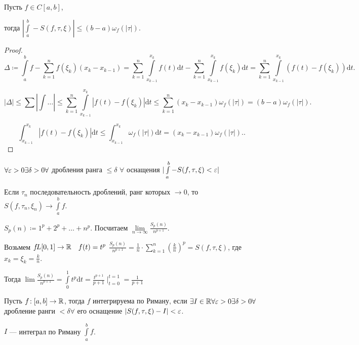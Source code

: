 \begin{theorem}
    Пусть $f \in C[a, b]$,

    тогда  $|\int\limits_a^b - S(f, \tau, \xi)| \le (b-a)\omega_f(|\tau|)$.
\end{theorem}
\begin{proof}
    \[\Delta \coloneqq \int\limits_a^b f - \sum\limits_{k=1}^n f(\xi_k)(x_k - x_{k-1}) = \sum\limits_{k=1}^n \int\limits_{x_{k-1}}^{x_k} f(t)\mathrm{d}t - \sum\limits_{k=1}^n \int\limits_{x_{k-1}}^{x_k}f(\xi_k) \mathrm{d}t = \sum\limits_{k=1}^n \int\limits_{x_{k-1}}^{x_k}(f(t) - f(\xi_k))\mathrm{d}t.\] 

    \[|\Delta| \le \sum |\int \ldots| \le \sum\limits_{k=1}^n \int\limits_{x_{k-1}}^{x_k} |f(t) - f(\xi_k)| \mathrm{d}t \le \sum_{k=1}^n (x_k - x_{k-1})\omega_f(|\tau|) = (b-a)\omega_f(|\tau|).\]

    \[
        \int_{x_{k-1}}^{x_k} |f(t) - f(\xi_k)| \mathrm{d}t \le \int_{x_{k-1}}^{x_k} \omega_f(|\tau|) \mathrm{d}t = (x_k - x_{k-1}) \omega_f(|\tau|).
    .\] 
\end{proof}
\begin{consequence}
    $\forall \varepsilon > 0 \exists \delta > 0 \forall$ дробления ранга  $\le \delta$ $\forall$ оснащения  $|\int\limits_a^b - S(f, \tau, \xi) < \varepsilon|$
\end{consequence}
\begin{consequence}
    Если $\tau_n$ последовательность дроблений, ранг которых  $\to 0$, то $S(f, \tau_n, \xi_n) \to \int\limits_a^b f$.  
\end{consequence}
\begin{example}
    $S_p(n) \coloneqq 1^p + 2^p + \ldots + n^p$. Посчитаем $\lim\limits_{n \to \infty} \frac{S_p(n)}{n^{p+1}}$.

    Возьмем $f\!L [0,1 ] \to \mathbb{R}\quad f(t) = t^p$
    $\frac{S_p(n)}{n^{p+1}} = \frac{1}{n} \cdot \sum\limits_{k=1}^n \left(\frac{k}{n}\right)^p = S(f, \tau, \xi)$, где $x_k = \xi_k = \frac{k}{n}$.

    Тогда $\lim \frac{S_p(n)}{n^{p+1}} = \int\limits_0^1 t^p \mathrm{d}t = \frac{t^{p+1}}{p+1} \mid_{t=0}^{t=1} = \frac{1}{p+1}$
\end{example}

\begin{definition}
    Пусть $f\!: [a, b] \to \mathbb{R}$, тогда $f$  интегрируема по Риману, если $\exists I \in \mathbb{R} \forall \varepsilon > 0 \exists \delta > 0 \forall$ дробление ранги  $< \delta \forall$ его оснащение  $|S(f, \tau, \xi) - I| < \varepsilon$. 

     $I$ --- интеграл по Риману  $\int\limits_a^b f$.
\end{definition}

